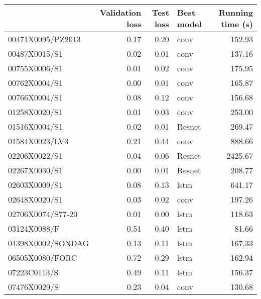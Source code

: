 \begin{tabular}{lrrlr}
\toprule
{} &  Validation loss &  Test loss & Best model &  Running time (s) \\
\midrule
00471X0095/PZ2013 &             0.17 &       0.20 &       conv &            152.93 \\
00487X0015/S1     &             0.02 &       0.01 &       conv &            137.16 \\
00755X0006/S1     &             0.01 &       0.02 &       conv &            175.95 \\
00762X0004/S1     &             0.00 &       0.01 &       conv &            165.87 \\
00766X0004/S1     &             0.08 &       0.12 &       conv &            156.68 \\
01258X0020/S1     &             0.01 &       0.03 &       conv &            253.00 \\
01516X0004/S1     &             0.02 &       0.01 &     Resnet &            269.47 \\
01584X0023/LV3    &             0.21 &       0.44 &       conv &            888.66 \\
02206X0022/S1     &             0.04 &       0.06 &     Resnet &           2425.67 \\
02267X0030/S1     &             0.00 &       0.01 &     Resnet &            208.77 \\
02603X0009/S1     &             0.08 &       0.13 &       lstm &            641.17 \\
02648X0020/S1     &             0.03 &       0.02 &       conv &            197.26 \\
02706X0074/S77-20 &             0.01 &       0.00 &       lstm &            118.63 \\
03124X0088/F      &             0.51 &       0.40 &       lstm &             81.66 \\
04398X0002/SONDAG &             0.13 &       0.11 &       lstm &            167.33 \\
06505X0080/FORC   &             0.72 &       0.29 &       lstm &            162.94 \\
07223C0113/S      &             0.49 &       0.11 &       lstm &            156.37 \\
07476X0029/S      &             0.23 &       0.04 &       conv &            130.68 \\
\bottomrule
\end{tabular}

